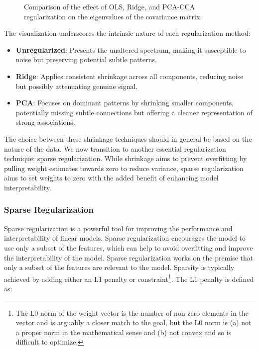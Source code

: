 \begin{figure}
    \centering
    
    \caption{Comparison of the effect of OLS, Ridge, and PCA-CCA regularization on the eigenvalues of the covariance matrix.}\label{fig:shrinkage}
\end{figure}

The visualization underscores the intrinsic nature of each regularization method:
\begin{itemize}
    \item \textbf{Unregularized}: Presents the unaltered spectrum, making it susceptible to noise but preserving potential subtle patterns.
    \item \textbf{Ridge}: Applies consistent shrinkage across all components, reducing noise but possibly attenuating genuine signal.
    \item \textbf{PCA}: Focuses on dominant patterns by shrinking smaller components, potentially missing subtle connections but offering a cleaner representation of strong associations.
\end{itemize}
The choice between these shrinkage techniques should in general be based on the nature of the data.
We now transition to another essential regularization technique: sparse regularization.
While shrinkage aims to prevent overfitting by pulling weight estimates towards zero to reduce variance, sparse regularization aims to set weights to zero with the added benefit of enhancing model interpretability.

\subsubsection{Sparse Regularization}

Sparse regularization is a powerful tool for improving the performance and interpretability of linear models.
Sparse regularization encourages the model to use only a subset of the features, which can help to avoid overfitting and improve the interpretability of the model.
Sparse regularization works on the premise that only a subset of the features are relevant to the model.
Sparsity is typically achieved by adding either an L1 penalty or constraint\footnote{The L0 norm of the weight vector is the number of non-zero elements in the vector and is arguably a closer match to the goal, but the L0 norm is (a) not a proper norm in the mathematical sense and (b) not convex and so is difficult to optimize.}.
The L1 penalty is defined as:

